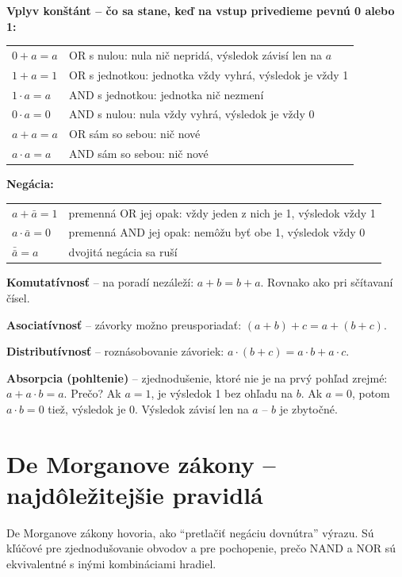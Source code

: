 \textbf{Vplyv konštánt -- čo sa stane, keď na vstup privedieme pevnú 0 alebo 1:}
\begin{center}
\begin{tabular}{ll}
$0 + a = a$ & OR s nulou: nula nič nepridá, výsledok závisí len na $a$ \\
$1 + a = 1$ & OR s jednotkou: jednotka vždy vyhrá, výsledok je vždy 1 \\
$1 \cdot a = a$ & AND s jednotkou: jednotka nič nezmení \\
$0 \cdot a = 0$ & AND s nulou: nula vždy vyhrá, výsledok je vždy 0 \\
$a + a = a$ & OR sám so sebou: nič nové \\
$a \cdot a = a$ & AND sám so sebou: nič nové \\
\end{tabular}
\end{center}

\textbf{Negácia:}
\begin{center}
\begin{tabular}{ll}
$a + \bar{a} = 1$ & premenná OR jej opak: vždy jeden z nich je 1, výsledok vždy 1 \\
$a \cdot \bar{a} = 0$ & premenná AND jej opak: nemôžu byť obe 1, výsledok vždy 0 \\
$\bar{\bar{a}} = a$ & dvojitá negácia sa ruší \\
\end{tabular}
\end{center}

\textbf{Komutatívnosť} -- na poradí nezáleží: $a + b = b + a$. Rovnako ako pri sčítavaní čísel.

\textbf{Asociatívnosť} -- závorky možno preusporiadať: $(a + b) + c = a + (b + c)$.

\textbf{Distributívnosť} -- roznásobovanie závoriek: $a \cdot (b + c) = a\cdot b + a\cdot c$.

\textbf{Absorpcia (pohltenie)} -- zjednodušenie, ktoré nie je na prvý pohľad zrejmé: $a + a \cdot b = a$. Prečo? Ak $a=1$, je výsledok 1 bez ohľadu na $b$. Ak $a=0$, potom $a \cdot b = 0$ tiež, výsledok je 0. Výsledok závisí len na $a$ -- $b$ je zbytočné.

\section{De Morganove zákony -- najdôležitejšie pravidlá}

De Morganove zákony hovoria, ako ``pretlačiť negáciu dovnútra'' výrazu. Sú kľúčové pre zjednodušovanie obvodov a pre pochopenie, prečo NAND a NOR sú ekvivalentné s inými kombináciami hradiel.

